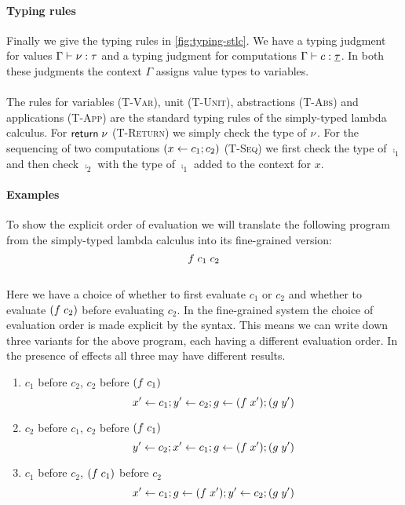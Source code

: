 {\paragraph{Typing rules}
Finally we give the typing rules in \cref{fig:typing-stlc}.
We have a typing judgment for values $\Gamma \vdash \nu : \tau$ and a typing judgment for computations $\Gamma \vdash c : \underline{\tau}$.
In both these judgments the context $\Gamma$ assigns value types to variables.
\\\\
The rules for variables ({\footnotesize\textsc{T-Var}}), unit ({\footnotesize\textsc{T-Unit}}), abstractions ({\footnotesize\textsc{T-Abs}}) and applications ({\footnotesize\textsc{T-App}}) are the standard typing rules of the simply-typed lambda calculus.
For $\mathsf{return} \; \nu$ ({\footnotesize\textsc{T-Return}}) we simply check the type of $\nu$.
For the sequencing of two computations $(x \leftarrow c_1 ; c_2)$ ({\footnotesize\textsc{T-Seq}}) we first check the type of $\comp_1$ and then check $\comp_2$ with the type of $\comp_1$ added to the context for $x$.

\iffalse
\paragraph{Examples}
To show the explicit order of evaluation we will translate the following program from the simply-typed lambda calculus into its fine-grained version:\\
\[f \; c_1 \; c_2\]\\
Here we have a choice of whether to first evaluate $c_1$ or $c_2$ and whether to evaluate $(f \; c_2)$ before evaluating $c_2$.
In the fine-grained system the choice of evaluation order is made explicit by the syntax.
This means we can write down three variants for the above program, each having a different evaluation order.
In the presence of effects all three may have different results.

\begin{enumerate}
\itemsep0em 
\item $c_1$ before $c_2$, $c_2$ before $(f \; c_1)$ 
\[x' \leftarrow c_1 ; y' \leftarrow c_2 ; g \leftarrow (f \; x') ; (g \; y')\]
\item $c_2$ before $c_1$, $c_2$ before $(f \; c_1)$
\[y' \leftarrow c_2 ; x' \leftarrow c_1 ; g \leftarrow (f \; x') ; (g \; y')\]
\item $c_1$ before $c_2$, $(f \; c_1)$ before $c_2$
\[x' \leftarrow c_1 ; g \leftarrow (f \; x') ; y' \leftarrow c_2 ; (g \; y')\]
\end{enumerate}

}
